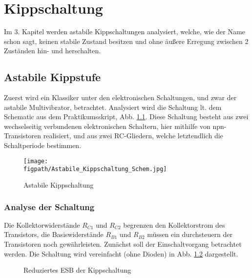 \def\figpath{tex/3_Kippschaltung/pictures}
\graphicspath{{tex/3_Kippschaltung/pictures/}}

\chapter{Kippschaltung}
Im 3. Kapitel werden astabile Kippschaltungen analysiert, welche, wie der Name schon sagt, keinen stabile Zustand besitzen und ohne äußere Erregung zwischen 2 Zuständen hin- und herschalten. 

\section{Astabile Kippstufe}
Zuerst wird ein Klassiker unter den elektronischen Schaltungen, und zwar der astabile Multivibrator, betrachtet. Analysiert wird die Schaltung lt. dem Schematic aus dem Praktikumsskript, Abb. \ref{fig_Kap3_01:Astab_Schem}. Diese Schaltung besteht aus zwei wechselseitig verbundenen elektronischen Schaltern, hier mithilfe von npn-Transistoren realisiert, und aus zwei RC-Gliedern, welche letztendlich die Schaltperiode bestimmen.

\begin{figure}[H]
    \centering
    \texttt{[image: \\figpath/Astabile\_Kippschaltung\_Schem.jpg]}
    \caption{Astabile Kippschaltung}
    \label{fig_Kap3_01:Astab_Schem}
\end{figure}

\subsection{Analyse der Schaltung}
Die Kollektorwiderstände $R_{C1}$ und $R_{C2}$ begrenzen den Kollektorstrom des Transistors, die Basiswiderstände $R_{B1}$ und $R_{B2}$ müssen ein durchsteuern der Transistoren noch gewährleisten. Zunächst soll der Einschaltvorgang betrachtet werden. Die Schaltung wird vereinfacht (ohne Dioden) in Abb. \ref{fig_Kap3_02:Kipp_ESB} dargestellt. 

\begin{figure}[H]
	\centering
	\def\svgwidth{\textwidth}
	
	\caption{Reduziertes ESB der Kippschaltung} 
	\label{fig_Kap3_02:Kipp_ESB} 
\end{figure}


